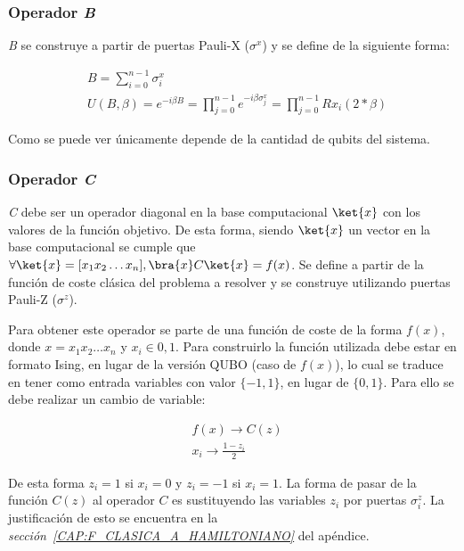 \subsubsection{Operador \textit{B}}
\textit{B} se construye a partir de puertas Pauli-X ($\sigma^x$) y se define de la siguiente forma:

\begin{align*}
  &B = \sum_{i=0}^{n-1}\sigma^x_{i} \\
  &U(B, \beta) = e^{-i \beta B} = \prod_{j=0}^{n-1}e^{-i \beta \sigma^x_j} = \prod_{j=0}^{n-1}Rx_i(2*\beta)  %
\end{align*}

Como se puede ver únicamente depende de la cantidad de qubits del sistema.

\subsubsection{Operador \textit{C}\label{sec:3-operador c}}
\textit{C} debe ser un operador diagonal  %
en la base computacional \(\ket{x}\) con los valores de la función objetivo. De esta forma, siendo \(\ket{x}\) un vector en la base computacional se cumple que \(\forall \ket{x} = [x_1x_2 \ldots x_n], \bra{x}C\ket{x} = f(x)\). Se define a partir de la función de coste clásica del problema a resolver y se construye utilizando puertas Pauli-Z ($\sigma^z$).

Para obtener este operador se parte de una función de coste de la forma \(f(x)\), donde \(x=x_1x_2 \ldots x_n\) y \(x_i\in{0, 1}\).
Para construirlo la función utilizada debe estar en formato Ising, en lugar de la versión QUBO (caso de $f(x)$), lo cual se traduce en tener como entrada variables con valor \(\{-1, 1\}\), en lugar de \(\{0, 1\}\).
Para ello se debe realizar un cambio de variable:

\begin{align*}
  &f(x) \rightarrow C(z) \\
  &x_i \rightarrow \frac{1 - z_i}{2}
\end{align*}

De esta forma $z_i = 1$ si $x_i = 0$ y $z_i = -1$ si $x_i = 1$.
La forma de pasar de la función $C(z)$ al operador $C$ es sustituyendo las variables \(z_i\) por puertas \(\sigma^z_i\). La justificación de esto se encuentra en la \textit{sección~\ref{CAP:F_CLASICA_A_HAMILTONIANO}} del apéndice.

